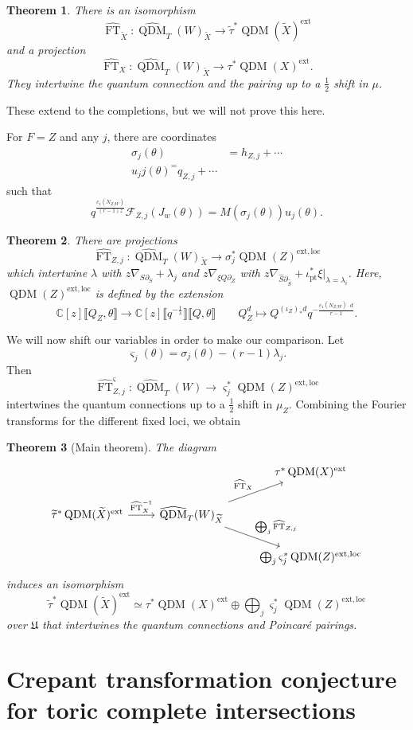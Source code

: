 \documentclass[leqno, openany]{memoir}
\newtheorem{thm}{Theorem}[section]
\theoremstyle{definition}
\theoremstyle{remark}
\theoremstyle{plain}
\theoremstyle{definition}
\theoremstyle{remark}
\newcommand{\C}{\mathbb{C}}
\newcommand{\mc}[1]{\mathcal{#1}}
\newcommand{\mf}[1]{\mathfrak{#1}}
\newcommand{\mr}[1]{\mathrm{#1}}
\newcommand{\on}[1]{\operatorname{#1}}
\newcommand{\wt}[1]{\widetilde{#1}}
\newcommand{\wh}[1]{\widehat{#1}}
\DeclareMathOperator{\QDM}{QDM}
\begin{document}
\begin{thm}
    There is an isomorphism
    \[ \wh{\on{FT}}_{\wt{X}} \colon \wh{\QDM}_T(W)_{\wt{X}} \to \wt{\tau}^* \QDM(\wt{X})^{\on{ext}} \]
    and a projection
    \[ \wh{\on{FT}}_X \colon \wh{\QDM}_T(W)_{\wt{X}} \to \tau^* \QDM(X)^{\on{ext}}. \]
    They intertwine the quantum connection and the pairing up to a $\frac{1}{2}$ shift in $\mu$.
\end{thm}

These extend to the completions, but we will not prove this here.

For $F=Z$ and any $j$, there are coordinates
\begin{align*}
    \sigma_j(\theta) &= h_{Z,j} + \cdots \\
    u_jj(\theta) ^= q_{Z,j} + \cdots
\end{align*}
such that
\[ q^{\frac{c_1(N_{Z/W})}{(r-1)z}} \mc{F}_{Z,j}(J_w(\theta)) = M(\sigma_j(\theta))u_j(\theta). \]

\begin{thm}
    There are projections
    \[ \wh{\on{FT}}_{Z,j} \colon \wh{\QDM}_T(W)_{\wt{X}} \to \sigma_j^* \QDM(Z)^{\mr{ext,loc}} \]
    which intertwine $\lambda$ with $z \nabla_{S \partial_S} + \lambda_j$ and $z \nabla_{\xi Q \partial_Z}$ with $z \nabla_{\wh{S} \partial_{\wh{S}}} + \iota_{\mr{pt}}^* \xi |_{\lambda = \lambda_i}$. Here, $\QDM(Z)^{\mr{ext,loc}}$ is defined by the extension
    \[ \C[z] \llbracket Q_Z, \theta \rrbracket \to \C[z] \llbracket q^{-\frac{1}{s}} \rrbracket \llbracket Q, \theta \rrbracket \qquad Q_Z^d \mapsto Q^{(\iota_Z)_* d} q^{-\frac{c_1(N_{Z/W})\cdot d}{r-1}}. \]
\end{thm}

We will now shift our variables in order to make our comparison. Let
\[ \varsigma_j(\theta) = \sigma_j(\theta) - (r-1)\lambda_j. \]
Then
\[ \wh{\on{FT}}_{Z,j}^{\varsigma} \colon \wh{\QDM}_T(W) \to \varsigma_j^* \QDM(Z)^{\mr{ext,loc}} \]
intertwines the quantum connections up to a $\frac{1}{2}$ shift in $\mu_Z$. Combining the Fourier transforms for the different fixed loci, we obtain

\begin{thm}[Main theorem]\label{thm:main}
    The diagram
    \begin{equation*}
    \begin{tikzcd}
        & & \tau^* \QDM(X)^{\mr{ext}} \\
        \wt{\tau}^* \QDM(\wt{X})^{\mr{ext}} \ar{r}{\wh{\on{FT}}_X^{-1}} & \wh{\QDM}_T(W)_{\wt{X}} \ar{ur}{\wh{\on{FT}}_X} \ar{dr}{\bigoplus_j \wh{\on{FT}}_{Z,j}}  \\
        & & \bigoplus_j \varsigma_j^* \QDM(Z)^{\mr{ext,loc}}
    \end{tikzcd}
    \end{equation*}
    induces an isomorphism
    \[ \wt{\tau}^* \QDM(\wt{X})^{\mr{ext}} \simeq \tau^* \QDM(X)^{\mr{ext}} \oplus \bigoplus_j \varsigma_j^* \QDM(Z)^{\mr{ext,loc}} \]
    over $\mf{U}$ that intertwines the quantum connections and Poincar\'e pairings.
\end{thm}


\chapter{Crepant transformation conjecture for toric complete intersections}%
\label{cha:Crepant transformation conjecture for toric complete intersections}
\end{document}
